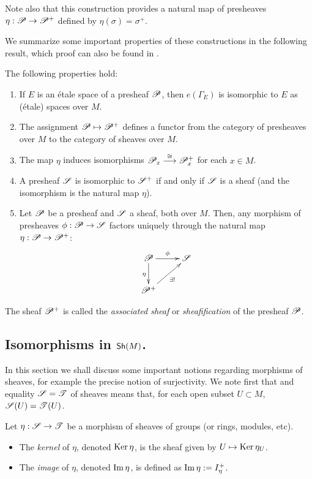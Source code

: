 Note also that this construction provides a natural map of presheaves $\eta :\mathscr{P}\to \mathscr{P}^+$ defined by $\eta (\sigma )=\sigma^+$.

We summarize some important properties of these constructions in the following result, which proof can also be found in \cite{tennison:_sheaf}.

\begin{theorem}\label{sheafification}
The following properties hold:
\begin{enumerate}
\item If $E$ is an \'etale space of a presheaf $\mathscr{P}$, then $e(\Gamma_E)$ is isomorphic to $E$ as (\'etale) spaces over $M$.
\item The assignment $\mathscr{P}\mapsto \mathscr{P}^+$ defines a functor from the category of presheaves over $M$ to the category of sheaves over $M$.
\item The map $\eta$ induces isomorphisms $\mathscr{P}_x\stackrel{\cong}{\longrightarrow}\mathscr{P}_x^+$ for each $x\in M$.
\item A presheaf $\mathscr{S}$ is isomorphic to $\mathscr{S}^+$ if and only if $\mathscr{S}$ is a sheaf (and the isomorphism is the natural map $\eta$).
\item Let $\mathscr{P}$ be a presheaf and $\mathscr{S}$ a sheaf, both over $M$. Then, any morphism of presheaves $\phi :\mathscr{P}\to \mathscr{S}$ factors uniquely through the natural map $\eta :\mathscr{P}\to \mathscr{P}^+$:
$$
\xymatrix{
\scr{P} \ar[r]^{\phi} \ar[d]_{\eta} & \scr{S} \\
\scr{P}^+ \ar[ur]_{\exists ! } & 
}$$
\end{enumerate}
\end{theorem}

The sheaf $\mathscr{P}^+$ is called the \emph{associated sheaf} or \emph{sheafification} of the presheaf $\mathscr{P}$.



\subsection{Isomorphisms in $\mathsf{Sh}(M)$.}
\label{section_isomorphisms}

In this section we shall discuss some important notions regarding morphisms of sheaves, for example the precise notion of surjectivity. We note first that and equality $\mathscr{S}=\mathscr{T}$ of sheaves means that, for each open subset $U\subset M$, $\mathscr{S}(U)=\mathscr{T}(U)$.

\begin{defi}\label{def_ker_image}
Let $\eta :\mathscr{S}\to \mathscr{T}$ be a morphism of sheaves of groups (or rings, modules, etc).
\begin{itemize}
\item The \emph{kernel} of $\eta$, denoted $\operatorname{Ker}\eta$, is the sheaf given by $U\mapsto \operatorname{Ker}\eta_U$.
\item The \emph{image} of $\eta$, denoted $\operatorname{Im}\eta$, is defined as $\operatorname{Im}\eta :=I_{\eta}^+$.
\end{itemize}
\end{defi}

